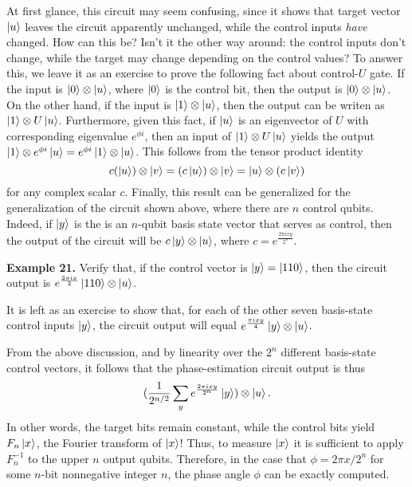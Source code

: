 \documentclass [12pt]{article}
\theoremstyle{definition}
\begin{document}
At first glance, this circuit may seem confusing, since it shows that target vector $\ket{u}$ leaves the circuit apparently unchanged,
 while the control inputs \textit{have} changed. How can this be? Isn't it the other way around: the control inputs don't change, while the target may change depending on 
 the control values? To answer this, we leave it as an exercise to prove the following fact about control-$U$ gate. If the input is $\ket{0}\otimes \ket{u}$, where $\ket{0}$ is
 the control bit, then the output is $\ket{0}\otimes \ket{u}$. On the other hand, if the input is $\ket{1}\otimes \ket{u}$, then the output can be writen 
 as $\ket{1}\otimes U\ket{u}$. Furthermore, given this fact, if $\ket{u}$ is an eigenvector of $U$ with corresponding eigenvalue $e^{\phi i}$, then an input of 
 $\ket{1}\otimes U\ket{u}$ yields the output  $\ket{1}\otimes e^{\phi i}\ket{u} = e^{\phi i}\ket{1}\otimes \ket{u}$. This follows from the tensor product identity
 \[c(\ket{u})\otimes \ket{v} = (c\ket{u})\otimes \ket{v} = \ket{u}\otimes (c\ket{v})\]
 for any complex scalar $c$. Finally, this result can be generalized for the generalization of the circuit shown above, where there are $n$  control qubits. Indeed, 
 if $\ket{y}$ is the 
 is an $n$-qubit basis state vector that serves as control, then the output of the circuit will be $c\ket{y}\otimes \ket{u}$, where $c = e^{\frac{2\pi ixy}{2^n}}$.
 
\textbf{Example 21.} Verify that, if the control vector is $\ket{y}=\ket{110}$, then the circuit output is $e^{\frac{3\pi ix}{2}}\ket{110}\otimes \ket{u}$.
 



\newpage
It is left as an exercise to show that, for each of the other seven basis-state control inputs $\ket{y}$, the circuit output will equal
$e^{\frac{\pi ixy}{4}}\ket{y}\otimes \ket{u}$.

From the above discussion, and by linearity over the $2^n$ different basis-state control vectors, it follows that the phase-estimation circuit output is 
thus 
\[(\frac{1}{2^{n/2}}\sum_{y}e^{\frac{2\pi ixy}{2^n}}\ket{y})\otimes \ket{u}.\]
In other words, the target bits remain constant, while the control bits yield $F_n\ket{x}$, the Fourier transform of $\ket{x}$! Thus, to measure $\ket{x}$ it is sufficient 
to apply $F_n^{-1}$ to the upper $n$ output qubits. Therefore, in the case that $\phi = 2\pi x/2^n$ for some $n$-bit nonnegative integer $n$, the phase angle $\phi$ can be 
exactly computed. 
\end{document}
